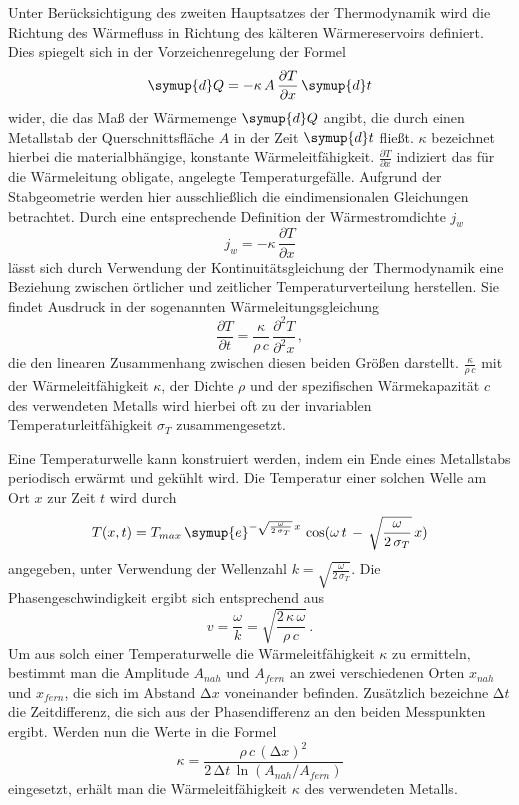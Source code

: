 Unter Berücksichtigung des zweiten Hauptsatzes der Thermodynamik wird die Richtung des Wärmefluss in Richtung des 
kälteren Wärmereservoirs definiert. 
Dies spiegelt sich in der Vorzeichenregelung der Formel 
\begin{equation}
    \symup{d}Q = - \kappa \, A \, \frac{\partial T}{\partial x} \, \symup{d}t 
    \label{eqn:waermestrom}
\end{equation}
wider, die das Maß der Wärmemenge $\symup{d}Q$ angibt, die durch einen Metallstab der Querschnittsfläche $A$ in der Zeit 
$\symup{d}t$ fließt. 
$\kappa$ bezeichnet hierbei die materialbhängige, konstante Wärmeleitfähigkeit. 
$\frac{\partial T}{\partial x}$ indiziert das für die Wärmeleitung obligate, angelegte Temperaturgefälle.
Aufgrund der Stabgeometrie werden hier ausschließlich die eindimensionalen Gleichungen betrachtet.
Durch eine entsprechende Definition der Wärmestromdichte $j_w$
\begin{equation}
    j_w = - \kappa \, \frac{\partial T}{\partial x}
\end{equation}
lässt sich durch Verwendung der Kontinuitätsgleichung der Thermodynamik eine Beziehung zwischen örtlicher und zeitlicher 
Temperaturverteilung herstellen. 
Sie findet Ausdruck in der sogenannten Wärmeleitungsgleichung 
\begin{equation}
    \frac{\partial T}{\partial t} = \frac{\kappa}{\rho \, c} \, \frac{\partial^2 T}{\partial^2 x} \, ,
\end{equation}
die den linearen Zusammenhang zwischen diesen beiden Größen darstellt. 
$\frac{\kappa}{\rho \, c}$ mit der Wärmeleitfähigkeit $\kappa$, der Dichte $\rho$ und der spezifischen Wärmekapazität $c$ 
des verwendeten Metalls wird hierbei oft zu der invariablen Temperaturleitfähigkeit $\sigma_T$ zusammengesetzt. 

Eine Temperaturwelle kann konstruiert werden, indem ein Ende eines Metallstabs periodisch erwärmt und gekühlt wird. 
Die Temperatur einer solchen Welle am Ort $x$ zur Zeit $t$ wird durch
\begin{equation}
    T(x,t) = T_{max} \, \symup{e}^{- \sqrt{\frac{\omega}{2 \, \sigma_T}} \, x} \, \cos(\omega \, t \, - \, \sqrt{\frac{\omega}{2 \, \sigma_T}} \, x )
\end{equation}
angegeben, unter Verwendung der Wellenzahl $k = \sqrt{\frac{\omega}{2 \, \sigma_T}}$. 
Die Phasengeschwindigkeit ergibt sich entsprechend aus 
\begin{equation}
    v = \frac{\omega}{k} = \sqrt{\frac{2 \, \kappa \, \omega}{\rho \, c}} \, .
\end{equation}
Um aus solch einer Temperaturwelle die Wärmeleitfähigkeit $\kappa$ zu ermitteln, bestimmt man die Amplitude 
$A_{nah}$ und $A_{fern}$ an zwei verschiedenen Orten $x_{nah}$ und $x_{fern}$, die sich im Abstand $\increment x$ 
voneinander befinden. Zusätzlich bezeichne $\increment t$ die Zeitdifferenz, die sich aus der Phasendifferenz 
an den beiden Messpunkten ergibt. 
Werden nun die Werte in die Formel 
\begin{equation}
    \kappa = \frac{\rho \, c \, (\increment x)^2}{2 \, \increment t \, \ln(A_{nah} / A_{fern})}
\end{equation}
eingesetzt, erhält man die Wärmeleitfähigkeit $\kappa$ des verwendeten Metalls. 
